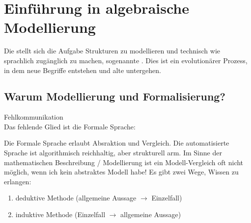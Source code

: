 
\section{Einführung in algebraische Modellierung}

Die  stellt sich die Aufgabe Strukturen zu modellieren und technisch wie sprachlich zugänglich zu machen, sogenannte .
Dies ist ein evolutionärer Prozess, in dem neue Begriffe entstehen und alte untergehen.

\subsection{Warum Modellierung und Formalisierung?}

\begin{figure}[H]
	\begin{center}
		
	\end{center}
\end{figure}

 Fehlkommunikation\\
Das fehlende Glied ist die Formale Sprache:

\begin{figure}[H] %
	\begin{center}
		
	\end{center}
\end{figure}

Die Formale Sprache erlaubt Absraktion und Vergleich.
Die automatisierte Sprache ist algorithmisch reichhaltig, aber strukturell arm.
Im Sinne der mathematischen Beschreibung / Modellierung ist ein Modell-Vergleich oft nicht möglich, wenn ich kein abstraktes Modell habe!\nl
Es gibt zwei Wege, Wissen zu erlangen:
\begin{enumerate}
	\item {} deduktive Methode (allgemeine Aussage $\to$ Einzelfall)
	\item {} induktive Methode (Einzelfall $\to$ allgemeine Aussage)
\end{enumerate}

